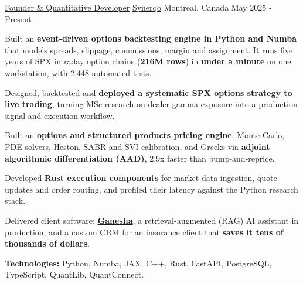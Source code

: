 \begin{cventries}

  \cventry
    {\href{https://synerqo.com/}{Founder \& Quantitative Developer}}
    {\href{https://synerqo.com/}{Synerqo}}
    {Montreal, Canada}
    {May 2025 - Present}
    {
      \begin{cvitems}
        \item{Built an \textbf{event-driven options backtesting engine in Python and Numba} that models spreads, slippage, commissions, margin and assignment. It runs five years of SPX intraday option chains (\textbf{216M rows}) in \textbf{under a minute} on one workstation, with 2,448 automated tests.}
        \item{Designed, backtested and \textbf{deployed a systematic SPX options strategy to live trading}, turning MSc research on dealer gamma exposure into a production signal and execution workflow.}
        \item{Built an \textbf{options and structured products pricing engine}: Monte Carlo, PDE solvers, Heston, SABR and SVI calibration, and Greeks via \textbf{adjoint algorithmic differentiation (AAD)}, 2.9x faster than bump-and-reprice.}
        \item{Developed \textbf{Rust execution components} for market-data ingestion, quote updates and order routing, and profiled their latency against the Python research stack.}
        \item{Delivered client software: \textbf{\href{https://ganesha.synerqo.com}{Ganesha}}, a retrieval-augmented (RAG) AI assistant in production, and a custom CRM for an insurance client that \textbf{saves it tens of thousands of dollars}.}
        \item{\textbf{Technologies:} Python, Numba, JAX, C++, Rust, FastAPI, PostgreSQL, TypeScript, QuantLib, QuantConnect.}
      \end{cvitems}
    }


\end{cventries}
